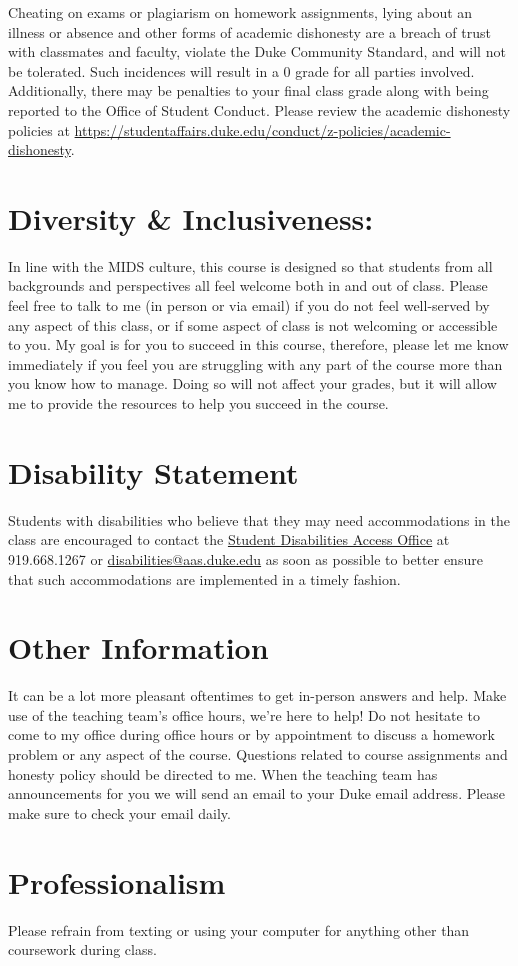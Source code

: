 \documentclass[11pt, a4paper]{article}
\begin{document}
Cheating on exams or plagiarism on homework assignments, lying about an illness or absence and other forms of academic dishonesty are a breach of trust with classmates and faculty, violate the Duke Community Standard, and will not be tolerated. Such incidences will result in a 0 grade for all parties involved. Additionally, there may be penalties to your final class grade along with being reported to the Office of Student Conduct. Please review the academic dishonesty policies at \url{https://studentaffairs.duke.edu/conduct/z-policies/academic-dishonesty}.


\section{Diversity \& Inclusiveness:}
In line with the MIDS culture, this course is designed so that students from all backgrounds and perspectives all feel welcome both in and out of class. Please feel free to talk to me (in person or via email) if you do not feel well-served by any aspect of this class, or if some aspect of class is not welcoming or accessible to you. My goal is for you to succeed in this course, therefore, please let me know immediately if you feel you are struggling with any part of the course more than you know how to manage. Doing so will not affect your grades, but it will allow me to provide the resources to help you succeed in the course.


\section{Disability Statement} 
Students with disabilities who believe that they may need accommodations in the class are encouraged to contact the \href{https://access.duke.edu/students/staff.php}{Student Disabilities Access Office} at 919.668.1267 or \href{mailto:disabilities@aas.duke.edu}{disabilities@aas.duke.edu}  as soon as possible to better ensure that such accommodations are implemented in a timely fashion.


\section{Other Information} 
It can be a lot more pleasant oftentimes to get in-person answers and help. Make use of the teaching team's office hours, we're here to help! Do not hesitate to come to my office during office hours or by appointment to discuss a homework problem or any aspect of the course.  Questions related to course assignments and honesty policy should be directed to me. When the teaching team has announcements for you we will send an email to your Duke email address. Please make sure to check your email daily.


\section{Professionalism}
Please refrain from texting or using your computer for anything other than coursework during class.
\end{document}
